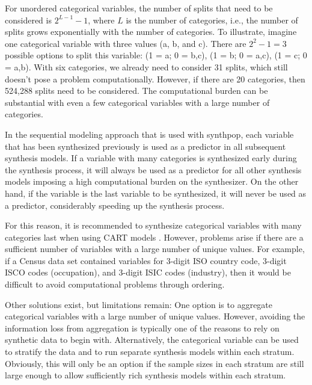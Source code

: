 \documentclass[runningheads]{llncs}
\begin{document}
For unordered categorical variables, the number of splits that need to be considered is $2^{L-1}-1$, where $L$ is the number of categories, i.e., the number of splits grows exponentially with the number of categories. To illustrate, imagine one categorical variable with three values (a, b, and c).  There are $2^2-1=3$ possible options to split this variable: (1 = a; 0 = b,c), (1 = b; 0 = a,c), (1 = c; 0 = a,b). With six categories, we already need to consider 31 splits, which still doesn't pose a problem computationally. However, if there are 20 categories, then 524,288 splits need to be considered.  The computational burden can be substantial with even a few categorical variables with a large number of categories.

In the sequential modeling approach that is used with synthpop, each variable that has been synthesized previously is used as a predictor in all subsequent synthesis models.  If a variable with many categories is synthesized early during the synthesis process, it will always be used as a predictor for all other synthesis models imposing a high computational burden on the synthesizer. On the other hand, if the variable is the last variable to be synthesized, it will never be used as a predictor, considerably speeding up the synthesis process. 

For this reason, it is recommended to synthesize categorical variables with many categories last when using CART models \cite{raab2017guidelines}.  However, problems arise if there are a sufficient number of variables with a large number of unique values.  For example, if a Census data set contained variables for 3-digit ISO country code, 3-digit ISCO codes (occupation), and 3-digit ISIC codes (industry), then it would be difficult to avoid computational problems through ordering.  

Other solutions exist, but limitations remain:  One option is to aggregate categorical variables with a large number of unique values.  However, avoiding the information loss from aggregation is typically one of the reasons to rely on synthetic data to begin with.  Alternatively, the categorical variable can be used to stratify the data and to run separate synthesis models within each stratum. Obviously, this will only be an option if the sample sizes in each stratum are still large enough to allow sufficiently rich synthesis models within each stratum.
\end{document}
